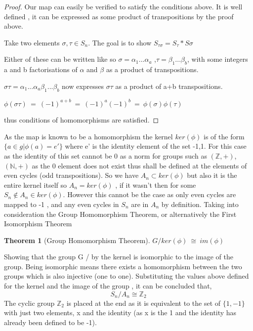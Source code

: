 \documentclass{article}
\newtheorem{theorem}{Theorem}[section]
\begin{document}
\begin{proof}
\item Our map can easily be verified to satisfy the conditions above. It is well defined , it can be expressed as some product of transpositions by the proof above.
\item Take two elements $\sigma , \tau \in S_{n}$. The goal is to show $S_{\tau\sigma} = S_{\tau}*S{\sigma}$
\item Either of these can be written like so $\sigma = \alpha_{1} ... \alpha_{a}$ ,$\tau = \beta_{1} ... \beta_{b}$, with some integers a and b factorisations of $\alpha$ and $\beta$ as a product of transpositions. 
\item $\sigma\tau = \alpha_{1} ... \alpha_{a}\beta_{1} ... \beta_{b}$ now expresses $\sigma\tau$ as a product of a+b transpositions. 
\item $\phi(\sigma\tau)\ =\ (-1)^{a+b}\ =\ (-1)^{a}(-1)^{b}\ =\ \phi(\sigma)\phi(\tau)$
\item thus conditions of homomorphisms are satisfied.
\end{proof}
As the map is known to be a homomorphism the kernel $ker(\phi)$ is of the form $\{a \in g|\phi(a) =e'\}$ where e' is the identity element of the set {-1,1}. For this case as the identity of this set cannot be 0 as a norm for groups such as $(\mathbb{Z},+)$,$(\mathbb{N},+)$ as the 0 element does not exist thus shall be defined at the elements of even cycles (odd transpositions). So we have $A_{n}\subset ker(\phi)$ but also it is the entire kernel itself so $A_{n} = ker(\phi)$ , if it wasn't then for some $S_{n} \notin A_{n} \in ker(\phi)$. However this cannot be the case as only even cycles are mapped to -1 , and any even cycles in $S_{n}$ are in $A_{n}$ by definition.
Taking into consideration the Group Homomorphism Theorem, or alternatively the First Isomorphism Theorem  
\begin{theorem}[Group Homomorphism Theorem]
\label{eq:5}
$G/ker(\phi)\ \cong\ im(\phi)$
\end{theorem}
Showing that the group G / by the kernel is isomorphic to the image of the group. Being isomorphic means there exists a homomorphism between the two groups which is also injective (one to one).
Substituting the values above defined for the kernel and the image of the group , it can be concluded that,  
\begin{equation}
S_{n}/A_{n} \cong \mathbb{Z}_{2}
\end{equation}
The cyclic group $\mathbb{Z}_{2}$ is placed at the end as it is equivalent to the set of $\{1,-1\}$ with just two elements, x and the identity (as x is the 1 and the identity has already been defined to be -1).
\end{document}
